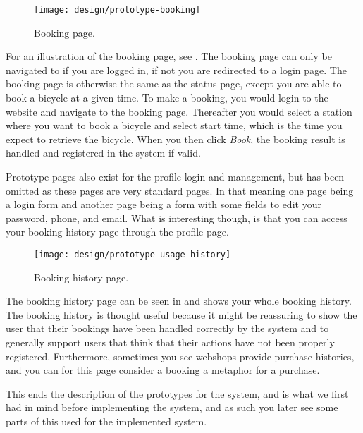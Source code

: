 \begin{figure}[h]
	\centering
	\texttt{[image: design/prototype-booking]}
	\caption{Booking page.}\label{fig:prototype-book}
\end{figure}

For an illustration of the booking page, see .
The booking page can only be navigated to if you are logged in, if not you are redirected to a login page.
The booking page is otherwise the same as the status page, except you are able to book a bicycle at a given time.
To make a booking, you would login to the website and navigate to the booking page.
Thereafter you would select a station where you want to book a bicycle and select start time, which is the time you expect to retrieve the bicycle.
When you then click \textit{Book}, the booking result is handled and registered in the system if valid.

Prototype pages also exist for the profile login and management, but has been omitted as these pages are very standard pages.
In that meaning one page being a login form and another page being a form with some fields to edit your password, phone, and email.
What is interesting though, is that you can access your booking history page through the profile page.

\begin{figure}[h]
	\centering
	\texttt{[image: design/prototype-usage-history]}
	\caption{Booking history page.}\label{fig:prototype-usage-history}
\end{figure}

The booking history page can be seen in  and shows your whole booking history.
The booking history is thought useful because it might be reassuring to show the user that their bookings have been handled correctly by the system and to generally support users that think that their actions have not been properly registered.
Furthermore, sometimes you see webshops provide purchase histories, and you can for this page consider a booking a metaphor for a purchase.

This ends the description of the prototypes for the system, and is what we first had in mind before implementing the system, and as such you later see some parts of this used for the implemented system.